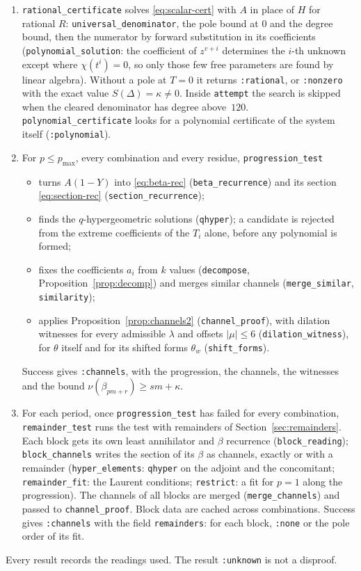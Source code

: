 \documentclass[11pt,a4paper]{article}
\newcommand{\val}{\nu}
\theoremstyle{plain}
\theoremstyle{definition}
\theoremstyle{remark}
\begin{document}
\begin{enumerate}
\item \texttt{rational\_certificate} solves \eqref{eq:scalar-cert} with $A$ in
  place of $H$ for rational $R$: \texttt{universal\_denominator}, the pole bound at $0$ and the
  degree bound, then the numerator by forward substitution in its coefficients
  (\texttt{polynomial\_solution}: the coefficient of $z^{v+i}$ determines the
  $i$-th unknown except where $\chi(t^i)=0$, so only those few free parameters
  are found by linear algebra). Without a pole at $T=0$ it returns
  \texttt{:rational}, or \texttt{:nonzero} with the exact value
  $S(\Delta)=\kappa\ne0$. Inside \texttt{attempt} the search is skipped when the
  cleared denominator has degree above~$120$. \texttt{polynomial\_certificate}
  looks for a polynomial certificate of the system itself (\texttt{:polynomial}).
\item For $p\le p_{\max}$, every combination and every residue,
  \texttt{progression\_test}
  \begin{itemize}
  \item turns $A(1-Y)$ into \eqref{eq:beta-rec} (\texttt{beta\_recurrence}) and
    its section \eqref{eq:section-rec} (\texttt{section\_recurrence});
  \item finds the $q$-hypergeometric solutions (\texttt{qhyper}); a candidate is
    rejected from the extreme coefficients of the $T_i$ alone, before any
    polynomial is formed;
  \item fixes the coefficients $a_i$ from $k$ values (\texttt{decompose},
    Proposition~\ref{prop:decomp}) and merges similar channels
    (\texttt{merge\_similar}, \texttt{similarity});
  \item applies Proposition~\ref{prop:channels2} (\texttt{channel\_proof}), with
    dilation witnesses for every admissible $\lambda$ and offsets $|\mu|\le6$
    (\texttt{dilation\_witness}), for $\theta$ itself and for its shifted forms
    $\theta_w$ (\texttt{shift\_forms}).
  \end{itemize}
  Success gives \texttt{:channels}, with the progression, the channels, the
  witnesses and the bound $\val(\beta_{pm+r})\ge sm+\kappa$.
\item For each period, once \texttt{progression\_test} has failed for every
  combination, \texttt{remainder\_test} runs the test with remainders of
  Section~\ref{sec:remainders}. Each block gets its own least annihilator and
  $\beta$ recurrence (\texttt{block\_reading}); \texttt{block\_channels} writes
  the section of its $\beta$ as channels, exactly or with a remainder
  (\texttt{hyper\_elements}: \texttt{qhyper} on the adjoint and the
  concomitant; \texttt{remainder\_fit}: the Laurent conditions;
  \texttt{restrict}: a fit for $p=1$ along the progression). The channels of
  all blocks are merged (\texttt{merge\_channels}) and passed to
  \texttt{channel\_proof}. Block data are cached across combinations. Success
  gives \texttt{:channels} with the field \texttt{remainders}: for each block,
  \texttt{:none} or the pole order of its fit.
\end{enumerate}
Every result records the readings used. The result \texttt{:unknown} is not a
disproof.
\end{document}

